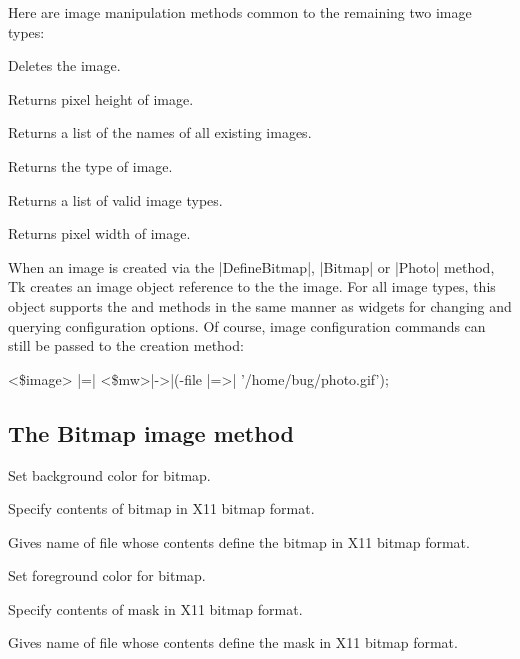 Here are image manipulation methods common to the remaining two image types:

\begin{enum}{1cm}

Deletes the image.

Returns pixel height of image.

Returns a list of the names of all existing images.

Returns the type of image.

Returns a list of valid image types.

Returns pixel width of image.

\end{enum}

When an image is created via the |DefineBitmap|, |Bitmap| or |Photo| method, Tk
creates an image object reference to the the image. For all image
types, this object supports the  and 
methods in the same manner as widgets for changing and querying
configuration options.  Of course, image configuration commands can still
be passed to the creation method:

<\$image> |=| <\$mw>|->|(-file |=>| '/home/bug/photo.gif');

\subsection*{The Bitmap image method}
\vspace{-4pt}

\begin{enum}{1cm}

Set background color for bitmap.

Specify contents of bitmap in X11 bitmap format.

Gives name of file whose contents define the bitmap in X11 bitmap format.

Set foreground color for bitmap.

Specify contents of mask in X11 bitmap format.

Gives name of file whose contents define the mask in X11 bitmap format.

\end{enum}

